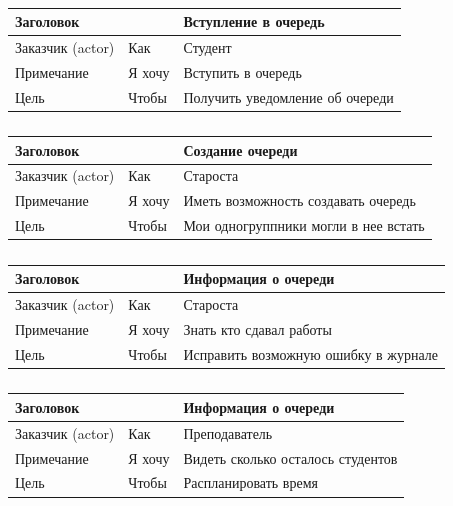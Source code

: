 \begin{table}[h!tp]
	\centering
	\caption{}
	\label{table:user_story:entrance}
	\begin{tabular}{|l|l|l|}
		\hline \multicolumn{2}{|l|}{Заголовок} & Вступление в очередь\\ \hline
		Заказчик (actor) & Как & Студент \\ \hline
		Примечание & Я хочу & Вступить в очередь\\ \hline
		Цель & Чтобы & Получить уведомление об очереди\\ \hline
	\end{tabular}
\end{table}
\begin{table}[h!tp]
	\centering
	\caption{}
	\label{table:user_story:create}
	\begin{tabular}{|l|l|l|}
		\hline \multicolumn{2}{|l|}{Заголовок} & Создание очереди\\ \hline
		Заказчик (actor) & Как & Староста \\ \hline
		Примечание & Я хочу & Иметь возможность создавать очередь\\ \hline
		Цель & Чтобы & Мои одногруппники могли в нее встать\\ \hline
	\end{tabular}
\end{table}
\begin{table}[h!tp]
	\centering
	\caption{}
	\label{table:user_story:info:elder}
	\begin{tabular}{|l|l|l|}
		\hline \multicolumn{2}{|l|}{Заголовок} & Информация о очереди\\ \hline
		Заказчик (actor) & Как & Староста \\ \hline
		Примечание & Я хочу & Знать кто сдавал работы\\ \hline
		Цель & Чтобы & Исправить возможную ошибку в журнале\\ \hline
	\end{tabular}
\end{table}
\begin{table}[h!tp]
	\centering
	\caption{}
	\label{table:user_story:info:teacher}
	\begin{tabular}{|l|l|l|}
		\hline \multicolumn{2}{|l|}{Заголовок} & Информация о очереди\\ \hline
		Заказчик (actor) & Как & Преподаватель \\ \hline
		Примечание & Я хочу & Видеть сколько осталось студентов\\ \hline
		Цель & Чтобы & Распланировать время\\ \hline
	\end{tabular}
\end{table}



